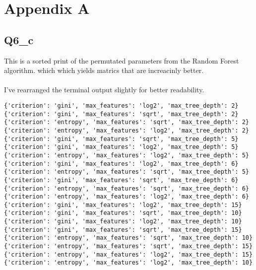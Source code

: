 \section{Appendix A}
\subsection{Q6\_c}

This is a sorted print of the permutated parameters from the Random Forest algorithm. which
which yields matrics that are increacinly better.
\\
\\
I've rearranged the terminal output slightly for better readability.

\begin{verbatim}
{'criterion': 'gini', 'max_features': 'log2', 'max_tree_depth': 2}
{'criterion': 'gini', 'max_features': 'sqrt', 'max_tree_depth': 2}
{'criterion': 'entropy', 'max_features': 'sqrt', 'max_tree_depth': 2}
{'criterion': 'entropy', 'max_features': 'log2', 'max_tree_depth': 2}
{'criterion': 'gini', 'max_features': 'sqrt', 'max_tree_depth': 5}
{'criterion': 'gini', 'max_features': 'log2', 'max_tree_depth': 5}
{'criterion': 'entropy', 'max_features': 'log2', 'max_tree_depth': 5}
{'criterion': 'gini', 'max_features': 'log2', 'max_tree_depth': 6}
{'criterion': 'entropy', 'max_features': 'sqrt', 'max_tree_depth': 5}
{'criterion': 'gini', 'max_features': 'sqrt', 'max_tree_depth': 6}
{'criterion': 'entropy', 'max_features': 'sqrt', 'max_tree_depth': 6}
{'criterion': 'entropy', 'max_features': 'log2', 'max_tree_depth': 6}
{'criterion': 'gini', 'max_features': 'log2', 'max_tree_depth': 15}
{'criterion': 'gini', 'max_features': 'sqrt', 'max_tree_depth': 10}
{'criterion': 'gini', 'max_features': 'log2', 'max_tree_depth': 10}
{'criterion': 'gini', 'max_features': 'sqrt', 'max_tree_depth': 15}
{'criterion': 'entropy', 'max_features': 'sqrt', 'max_tree_depth': 10}
{'criterion': 'entropy', 'max_features': 'sqrt', 'max_tree_depth': 15}
{'criterion': 'entropy', 'max_features': 'log2', 'max_tree_depth': 15}
{'criterion': 'entropy', 'max_features': 'log2', 'max_tree_depth': 10}
\end{verbatim}

\newpage
